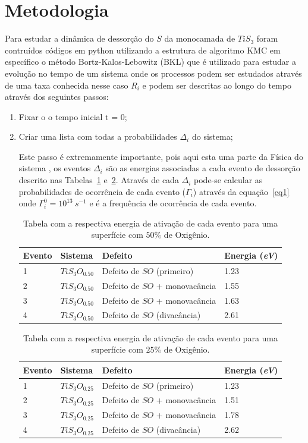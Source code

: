 \documentclass[12pt]{elsarticle}
\begin{document}
\section{Metodologia} Para estudar a dinâmica de dessorção do $S$ da monocamada de $TiS_3$ foram contruídos códigos em python utilizando a estrutura de algoritmo KMC em específico o método Bortz-Kalos-Lebowitz (BKL) que é utilizado para estudar a evolução no tempo de um sistema onde os processos podem ser estudados através de uma taxa conhecida nesse caso $R_i$ e podem ser descritas ao longo do tempo através dos seguintes passos:
\begin{enumerate}
\item Fixar o o tempo inicial t = 0;
\item Criar uma lista com todas a probabilidades $\Delta_i$ do sistema;
    
    Este passo é extremamente importante, pois aqui esta uma parte da Física do sistema , os eventos $\Delta_i$ são as energias associadas a cada evento de dessorção descrito nas Tabelas~\ref{t1} e~\ref{t2}. Através de cada $\Delta_i$ pode-se calcular as probabilidades de ocorrência de cada evento ($\Gamma_i$) através da equação~\ref{eq1} onde $\Gamma_{i}^{0}= 10^{13}~s^{-1}$ e é a frequência de ocorrência de cada evento.
\begin{table}[ht]
\centering
\begin{tabular}{| l| l| l| l|}
\hline
\textbf{Evento} & \textbf{Sistema} & \textbf{Defeito} & \textbf{Energia (\textit{eV})}\\
\hline  
\hline
1 & $TiS_3O_{0.50}$ & Defeito de $SO$ (primeiro)   & 1.23 \\
\hline
2 & $TiS_3O_{0.50}$ & Defeito de $SO$ + monovacância & 1.55 \\
\hline
3 & $TiS_3O_{0.50}$ & Defeito de $SO$ + monovacância& 1.63 \\
\hline
4 & $TiS_3O_{0.50}$ &  Defeito de $SO$ (divacância)& 2.61 \\
\hline
\end{tabular}
\caption{Tabela com a respectiva energia de ativação de cada evento para uma superfície com $50\%$ de Oxigênio.}
\label{t1}
\end{table}

\begin{table}[ht]
\centering
\begin{tabular}{| l| l| l| l|}
\hline
\textbf{Evento} & \textbf{Sistema} & \textbf{Defeito} & \textbf{Energia (\textit{eV})}\\
\hline  
\hline
1 & $TiS_3O_{0.25}$ & Defeito de $SO$ (primeiro)   & 1.23 \\
\hline
2 & $TiS_3O_{0.25}$ & Defeito de $SO$ + monovacância & 1.51 \\
\hline
3 & $TiS_3O_{0.25}$ & Defeito de $SO$ + monovacância& 1.78 \\
\hline
4 & $TiS_3O_{0.25}$ &  Defeito de $SO$ (divacância)& 2.62 \\
\hline
\end{tabular}
\caption{Tabela com a respectiva energia de ativação de cada evento para uma superfície com $25\%$ de Oxigênio.}
\label{t2}
\end{table}




\end{enumerate}
\end{document}
